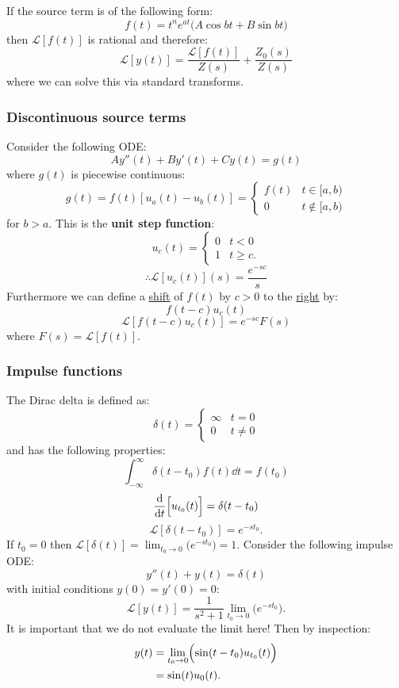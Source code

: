 \documentclass{article}
\begin{document}
\begin{multicols}{3}
If the source term is of the following form:
$$f(t)=t^n e^{at}\bigl(A\cos bt+B\sin bt\bigr)$$
then $\mathcal{L}[f(t)]$ is rational and therefore:
$$\mathcal{L}[y(t)]=\frac{\mathcal{L}[f(t)]}{Z(s)}+\frac{Z_0(s)}{Z(s)}$$
where we can solve this via standard transforms.

\subsubsection*{Discontinuous source terms}
Consider the following ODE:
$$Ay''(t)+By'(t)+Cy(t)=g(t)$$
where $g(t)$ is piecewise continuous:
$$g(t)=f(t)[u_a(t)-u_b(t)]
=\left\{
    \begin{array}{lr}
        f(t) & t\in[a,b) \\
        0 & t\notin[a,b)
    \end{array}
\right.$$
for $b>a$. This is the \textbf{unit step function}:
$$u_c(t)=\left\{
    \begin{array}{lr}
        0 & t<0 \\
        1 & t\geq c.
    \end{array}
\right.$$
$$\therefore\mathcal{L}[u_c(t)](s)=\frac{e^{-sc}}{s}$$
Furthermore we can define a \underline{shift} of $f(t)$ by $c>0$ to the 
\underline{right} by:
$$f(t-c)u_c(t)$$
$$\mathcal{L}[f(t-c)u_c(t)]=e^{-sc}F(s)$$
where $F(s)=\mathcal{L}[f(t)]$.

\subsubsection*{Impulse functions}
The Dirac delta is defined as:
$$\delta(t)=\left\{
    \begin{array}{lr}
        \infty & t=0 \\
        0 & t\neq0
    \end{array}
\right.$$
and has the following properties:
$$\int_{-\infty}^{\infty}\delta(t-t_0)
f(t)\dd t=f(t_0)$$
$$\dv{t}\Bigl[u_{t_0}(t)\Bigr]
=\delta(t-t_0)$$
$$\mathcal{L}[\delta(t-t_0)]
=e^{-st_0}.$$
If $t_0=0$ then
$\displaystyle\mathcal{L}[\delta(t)]
=\lim_{t_0\rightarrow0}
\bigl(e^{-st_0}\bigr)=1$.
Consider the following impulse ODE:
$$y''(t)+y(t)=\delta(t)$$
with initial conditions $y(0)=y'(0)=0$:
$$\mathcal{L}[y(t)]
=\frac{1}{s^2+1}
\lim_{t_0\rightarrow0}\bigl(
e^{-s t_0}
\bigr).$$
It is important that we do not evaluate the limit here!
Then by inspection:
\begin{align*}
    y(t)
    &=\lim_{t_0\rightarrow0}
    \Bigl(\sin(t-t_0)u_{t_0}(t)\Bigr) \\
    &=\sin(t)u_0(t).
\end{align*}


\end{multicols}
\end{document}
